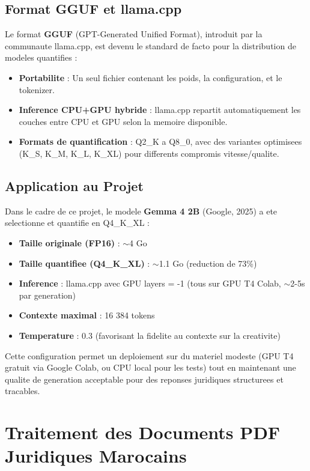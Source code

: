 \subsection{Format GGUF et llama.cpp}

Le format \textbf{GGUF} (GPT-Generated Unified Format), introduit par la communaute llama.cpp, est devenu le standard de facto pour la distribution de modeles quantifies :

\begin{itemize}
    \item \textbf{Portabilite} : Un seul fichier contenant les poids, la configuration, et le tokenizer.
    \item \textbf{Inference CPU+GPU hybride} : llama.cpp repartit automatiquement les couches entre CPU et GPU selon la memoire disponible.
    \item \textbf{Formats de quantification} : Q2\_K a Q8\_0, avec des variantes optimisees (K\_S, K\_M, K\_L, K\_XL) pour differents compromis vitesse/qualite.
\end{itemize}

\subsection{Application au Projet}

Dans le cadre de ce projet, le modele \textbf{Gemma 4 2B} (Google, 2025) a ete selectionne et quantifie en Q4\_K\_XL :

\begin{itemize}
    \item \textbf{Taille originale (FP16)} : $\sim$4 Go
    \item \textbf{Taille quantifiee (Q4\_K\_XL)} : $\sim$1.1 Go (reduction de 73\%)
    \item \textbf{Inference} : llama.cpp avec GPU layers = -1 (tous sur GPU T4 Colab, $\sim$2-5s par generation)
    \item \textbf{Contexte maximal} : 16 384 tokens
    \item \textbf{Temperature} : 0.3 (favorisant la fidelite au contexte sur la creativite)
\end{itemize}

Cette configuration permet un deploiement sur du materiel modeste (GPU T4 gratuit via Google Colab, ou CPU local pour les tests) tout en maintenant une qualite de generation acceptable pour des reponses juridiques structurees et tracables.

\section{Traitement des Documents PDF Juridiques Marocains}

